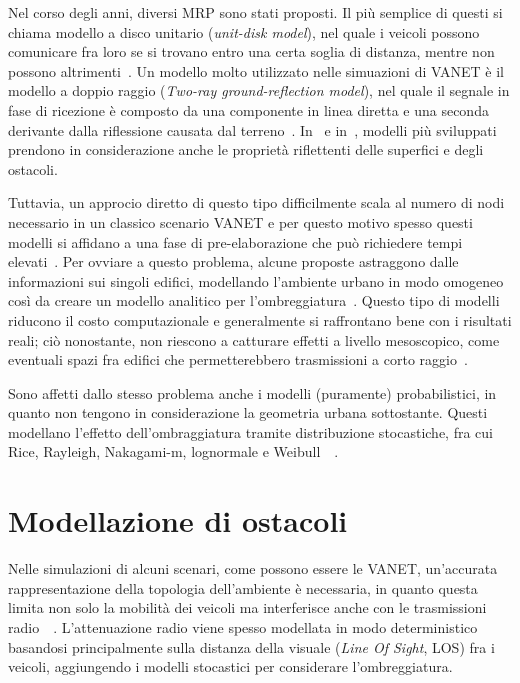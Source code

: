 Nel corso degli anni, diversi MRP sono stati proposti.
Il più semplice di questi si chiama modello a disco unitario (\textit{unit-disk model}), nel quale i veicoli possono comunicare fra loro se si trovano entro una certa soglia
di distanza, mentre non possono altrimenti~\cite{6554832}.
Un modello molto utilizzato nelle simuazioni di VANET è il modello a doppio raggio (\textit{Two-ray ground-reflection model}),
nel quale il segnale in fase di ricezione è composto da una componente in linea diretta e una seconda derivante dalla riflessione causata dal terreno~\cite{DBLP:books/daglib/0091821}.
In~\cite{Schmitz:2006:ERW:1164717.1164730} e in~\cite{Souley2005RealisticUS}, modelli più sviluppati prendono in considerazione anche le proprietà riflettenti delle superfici e degli ostacoli.

Tuttavia, un approcio diretto di questo tipo difficilmente scala al numero di nodi necessario in un classico scenario VANET e per questo motivo
spesso questi modelli si affidano a una fase di pre-elaborazione che può richiedere tempi elevati~\cite{Stepanov:2008:IMR:1293378.1293656}.
Per ovviare a questo problema, alcune proposte astraggono dalle informazioni sui singoli edifici, modellando l'ambiente urbano in modo omogeneo
così da creare un modello analitico per l'ombreggiatura~\cite{1492678}.
Questo tipo di modelli riducono il costo computazionale e generalmente si raffrontano bene con i risultati reali;
ciò nonostante, non riescono a catturare effetti a livello mesoscopico, come eventuali spazi fra edifici che permetterebbero trasmissioni a corto raggio~\cite{Giordano:2010:CST:1860058.1860065}.

Sono affetti dallo stesso problema anche i modelli (puramente) probabilistici, in quanto non tengono in considerazione la geometria urbana sottostante.
Questi modellano l'effetto dell'ombraggiatura tramite distribuzione stocastiche, fra cui Rice, Rayleigh, Nakagami-m, lognormale e Weibull~\cite{6554832}~\cite{Rappaport:2001:WCP:559977}.
%
\section{Modellazione di ostacoli}\label{sec:modellazione-ostacoli}
Nelle simulazioni di alcuni scenari, come possono essere le VANET, un'accurata rappresentazione della topologia dell'ambiente è necessaria,
in quanto questa limita non solo la mobilità dei veicoli ma interferisce anche con le trasmissioni radio~\cite{7543980}~\cite{amjad2015impact}.
L'attenuazione radio viene spesso modellata in modo deterministico basandosi principalmente sulla distanza della visuale (\textit{Line Of Sight}, LOS)
fra i veicoli, aggiungendo i modelli stocastici per considerare l'ombreggiatura.

